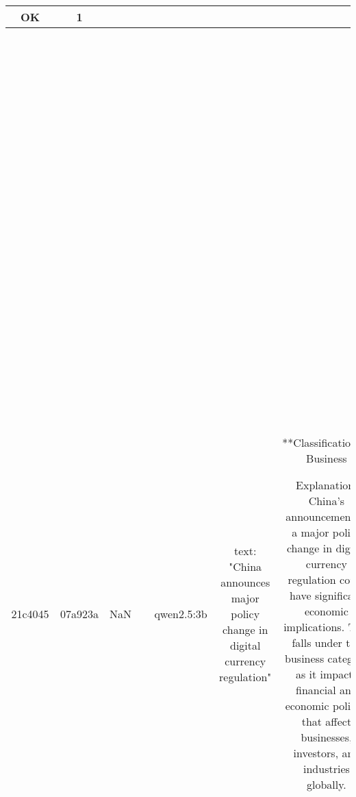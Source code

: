 \begin{table}[h!]
\begin{tabular}{|c|c|c|c|c|c|c|c|c|c|}
OK & 1\\
\hline
21c4045 & 07a923a & NaN &  & qwen2.5:3b & text: "China announces major policy change in digital currency regulation" & **Classification:** Business

Explanation: China's announcement of a major policy change in digital currency regulation could have significant economic implications. This falls under the business category as it impacts financial and economic policies that affect businesses, investors, and industries globally. & ok & The chatbot's output appears to provide a classification and an explanation for that classification based on the category "Business." The description specifies that the chatbot's task is to classify input text into one of the defined categories: World, Sports, Business, or Sci/Tech. The output successfully provides a single classification, "Business," which is a valid category according to the description. The explanation given for the classification pertains to economic and financial implications, which aligns with the "Business" category. The description does not specify the requirement for an explanation, so its inclusion does not violate any rules unless it contradicts the classification, which it does not appear to do here.

No violation.
OK & 1\\
\hline
21c4045 & 07a923a & NaN &  & llama3.2:1b & text: "China announces major policy change in digital currency regulation" & A news article can be classified as one of the following categories: World, Sci/Tech. & err & The chatbot output lists only two categories ("World" and "Sci/Tech") into which a news article can be classified. According to the chatbot description, there should be four categories ("World," "Sports," "Business," and "Sci/Tech"). Therefore, the output does not comply with the description as it omits the "Sports" and "Business" categories.

ERR & 1\\
\hline
04c78ba & 07a923a & NaN &  & gpt-4o-mini & text: "Football World Cup 2026 announced to host new qualifying format" & Sports & ok & The chatbot output is simply "Sports," which indicates the classification of a news article into one of the specified categories. However, according to the description, the chatbot's output should involve processing the input text (which is missing here) and provide a classification for it. Since I cannot make any assumptions about the input text, I can't verify if the output is correct. The output provided matches one of the categories ("Sports"), and without input, we can't determine if this is a compliant classification. However, as per the guidelines, we focus on compliance rather than correctness based on the input. Since there is no rule about how the output should be formatted or described after classification, the output complies with the description given since it's one of the possible categories specified.


\end{tabular}
\end{table}
